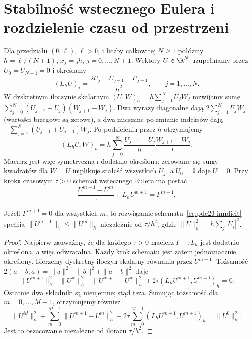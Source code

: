 \section{Stabilność wstecznego Eulera i rozdzielenie czasu od przestrzeni}
Dla przedziału $(0,\ell)$, $\ell>0$, i liczby całkowitej
$N\ge1$ połóżmy
$h=\ell/(N+1)$, $x_j=jh$, $j=0,\ldots,N+1$.
Wektory $U\in\R^N$ uzupełniamy przez $U_0=U_{N+1}=0$
i określamy
\[
 (L_hU)_j=\frac{2U_j-U_{j-1}-U_{j+1}}{h^2},
 \qquad j=1,\ldots,N.
\]
W dyskretnym iloczynie skalarnym
$(U,W)_h=h\sum_{j=1}^NU_jW_j$ rozwijamy sumę
$\sum_{j=0}^N(U_{j+1}-U_j)(W_{j+1}-W_j)$.
Dwa wyrazy diagonalne dają
$2\sum_{j=1}^NU_jW_j$ (wartości brzegowe są zerowe),
a dwa mieszane po zmianie indeksów dają
$-\sum_{j=1}^N(U_{j-1}+U_{j+1})W_j$.
Po podzieleniu przez $h$ otrzymujemy
\[
 (L_hU,W)_h
 =h\sum_{j=0}^N\frac{U_{j+1}-U_j}{h}
                    \frac{W_{j+1}-W_j}{h}.
\]
Macierz jest więc symetryczna i dodatnio określona:
zerowanie się sumy kwadratów dla $W=U$ implikuje
stałość wszystkich $U_j$, a $U_0=0$ daje $U=0$.
Przy kroku czasowym $\tau>0$ schemat
wstecznego Eulera ma postać
\begin{equation}\label{eq:pde20-implicit}
 \frac{U^{m+1}-U^m}{\tau}+L_hU^{m+1}=F^{m+1}.
\end{equation}
\begin{stwierdzenie}
\label{prop:pde20-be}
Jeżeli $F^{m+1}=0$ dla wszystkich $m$, to rozwiązanie
schematu~\eqref{eq:pde20-implicit} spełnia
$\|U^{m+1}\|_h\le\|U^m\|_h$ niezależnie od $\tau/h^2$,
gdzie $\|U\|_h^2=h\sum_j|U_j|^2$.
\end{stwierdzenie}
\begin{proof}
Najpierw zauważmy, że dla każdego $\tau>0$
macierz $I+\tau L_h$ jest dodatnio określona,
a więc odwracalna. Każdy krok schematu jest zatem
jednoznacznie określony.
Bierzemy dyskretny iloczyn skalarny równania przez $U^{m+1}$.
Tożsamość $2(a-b,a)=\|a\|^2-\|b\|^2+\|a-b\|^2$
daje
\[
 \|U^{m+1}\|_h^2-\|U^m\|_h^2
 +\|U^{m+1}-U^m\|_h^2
 +2\tau(L_hU^{m+1},U^{m+1})_h=0.
\]
Ostatnie dwa składniki są nieujemne; stąd teza.
Sumując tożsamość dla $m=0,\ldots,M-1$, otrzymujemy
również
\[
 \|U^M\|_h^2+\sum_{m=0}^{M-1}\|U^{m+1}-U^m\|_h^2
 +2\tau\sum_{m=0}^{M-1}(L_hU^{m+1},U^{m+1})_h
 =\|U^0\|_h^2.
\]
Jest to oszacowanie niezależne od ilorazu $\tau/h^2$.
\end{proof}

